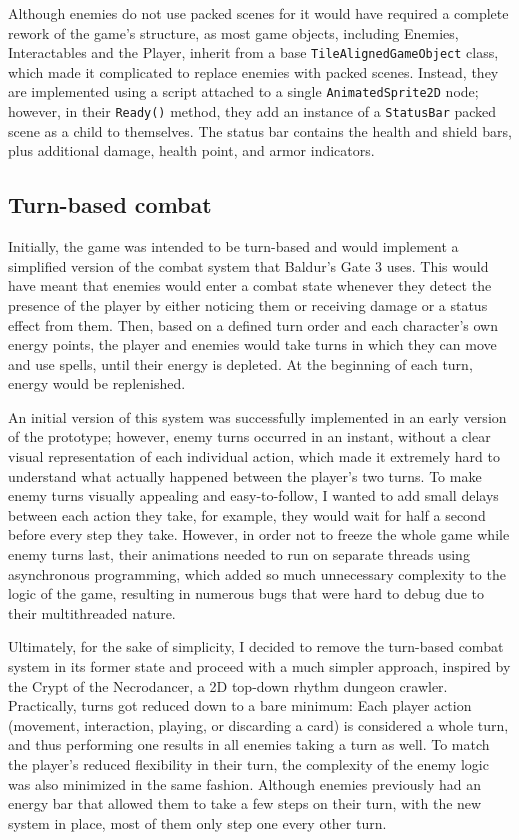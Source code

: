 Although enemies do not use packed scenes for it would have required a complete rework of the game's structure, as most game objects, including Enemies, Interactables and the Player, inherit from a base \verb|TileAlignedGameObject| class, which made it complicated to replace enemies with packed scenes. Instead, they are implemented using a script attached to a single \verb|AnimatedSprite2D| node; however, in their \verb|Ready()| method, they add an instance of a \verb|StatusBar| packed scene as a child to themselves. The status bar contains the health and shield bars, plus additional damage, health point, and armor indicators.



\subsection{Turn-based combat}

Initially, the game was intended to be turn-based and would implement a simplified version of the combat system that Baldur's Gate 3\cite{baldursgate2023} uses. This would have meant that enemies would enter a combat state whenever they detect the presence of the player by either noticing them or receiving damage or a status effect from them. Then, based on a defined turn order and each character's own energy points, the player and enemies would take turns in which they can move and use spells, until their energy is depleted. At the beginning of each turn, energy would be replenished. 

An initial version of this system was successfully implemented in an early version of the prototype; however, enemy turns occurred in an instant, without a clear visual representation of each individual action, which made it extremely hard to understand what actually happened between the player's two turns.
To make enemy turns visually appealing and easy-to-follow, I wanted to add small delays between each action they take, for example, they would wait for half a second before every step they take. However, in order not to freeze the whole game while enemy turns last, their animations needed to run on separate threads using asynchronous programming, which added so much unnecessary complexity to the logic of the game, resulting in numerous bugs that were hard to debug due to their multithreaded nature.

Ultimately, for the sake of simplicity, I decided to remove the turn-based combat system in its former state and proceed with a much simpler approach, inspired by the Crypt of the Necrodancer\cite{necrodancer2015}, a 2D top-down rhythm dungeon crawler. Practically, turns got reduced down to a bare minimum: Each player action (movement, interaction, playing, or discarding a card) is considered a whole turn, and thus performing one results in all enemies taking a turn as well. To match the player's reduced flexibility in their turn, the complexity of the enemy logic was also minimized in the same fashion. Although enemies previously had an energy bar that allowed them to take a few steps on their turn, with the new system in place, most of them only step one every other turn.




